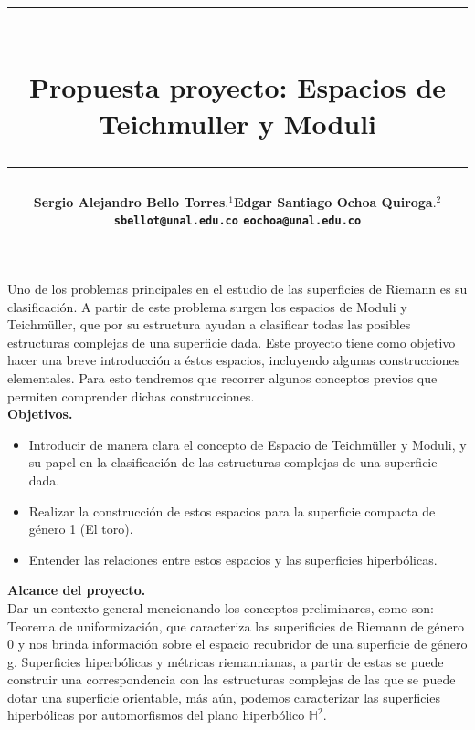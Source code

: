 \documentclass[12pt]{article}
\title{\vspace{-2cm}\par\noindent\rule{16cm}{1pt}\large
\\\bfseries Propuesta proyecto: Espacios de Teichmuller y Moduli
\vspace{-0.34cm}\par\noindent\hspace{0.15cm}\rule{16cm}{1pt}
\vspace{-0.6cm}
}
\author{\small \bfseries Sergio Alejandro Bello Torres$.^{1}$\quad \quad\small Edgar Santiago Ochoa Quiroga$.^{2}$\\ \small \quad \texttt{sbellot@unal.edu.co} \quad \quad \quad \quad \quad \quad \texttt{eochoa@unal.edu.co}\quad\quad \quad\\}
\begin{document}
\maketitle

Uno de los problemas principales en el estudio de las superficies de Riemann es su clasificación. A partir de este problema surgen los espacios de Moduli y Teichmüller, que por su estructura ayudan a clasificar todas las posibles estructuras complejas de una superficie dada. Este proyecto tiene como objetivo hacer una breve introducción a éstos espacios, incluyendo algunas construcciones elementales. Para esto tendremos que recorrer algunos conceptos previos que permiten comprender dichas construcciones.\\

\textbf{Objetivos.}
\begin{itemize}
    \item Introducir de manera clara el concepto de Espacio de Teichmüller y Moduli, y su papel en la clasificación de las estructuras complejas de una superficie dada.
    \item Realizar la construcción de estos espacios para la superficie compacta de género 1 (El toro).
    \item Entender las relaciones entre estos espacios y las superficies hiperbólicas.
\end{itemize}

\textbf{Alcance del proyecto.}\\
    
    Dar un contexto general mencionando los conceptos preliminares, como son: Teorema de uniformización, que caracteriza las superificies de Riemann de género 0 y nos brinda información sobre el espacio recubridor de una superficie de género g. Superficies hiperbólicas y métricas riemannianas, a partir de estas se puede construir una correspondencia con las estructuras complejas de las que se puede dotar una superficie orientable, más aún, podemos caracterizar las superficies hiperbólicas por automorfismos del plano hiperbólico $\mathbb{H}^2$.
    
    
    \nocite{*}
\end{document}
